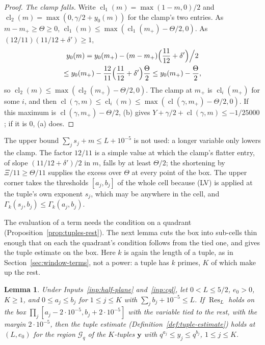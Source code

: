 \documentclass[11pt]{article}
\newtheorem{lemma}[theorem]{Lemma}
\theoremstyle{definition}
\begin{document}
\begin{proof}
\emph{The clamp falls.} Write $\operatorname{cl}_1(m) = \max(1 - m, 0)/2$ and $\operatorname{cl}_2(m) = \max(0, \gamma/2
+ y_0(m))$ for the clamp's two entries. As $m - m_+ \ge
\Theta \ge 0$, $\operatorname{cl}_1(m) \le \max(\operatorname{cl}_1(m_+) - \Theta/2, 0)$. As $(12/11)(11/12 + \delta')
\ge 1$,
\begin{multline*}
  y_0(m) = y_0(m_+) - (m - m_+)\Bigl(\frac{11}{12} + \delta'\Bigr)\Big/2 \\
  \le y_0(m_+) - \frac{12}{11}\Bigl(\frac{11}{12} + \delta'\Bigr)\frac\Theta2 \le y_0(m_+) - \frac\Theta2,
\end{multline*}
so $\operatorname{cl}_2(m) \le \max(\operatorname{cl}_2(m_+) - \Theta/2, 0)$. The clamp at $m_+$ is
$\operatorname{cl}_i(m_+)$ for some $i$, and then
$\operatorname{cl}(\gamma, m) \le \operatorname{cl}_i(m) \le \max(\operatorname{cl}(\gamma, m_+) - \Theta/2, 0)$. If this
maximum is $\operatorname{cl}(\gamma, m_+) - \Theta/2$, (b) gives $Y + \gamma/2 + \operatorname{cl}(\gamma, m) \le
-1/25000$; if it is $0$, (a) does.
\end{proof}

The upper bound $\sum_j s_j + m \le L + 10^{-5}$ is not used: a longer variable only lowers the clamp. The factor
$12/11$ is a simple value at which the clamp's flatter entry, of slope $(11/12 + \delta')/2$ in $m$, falls by at least
$\Theta/2$; the
shortening by $\Xi/11 \ge \Theta/11$ supplies the excess over $\Theta$ at every point of the box. The upper corner
takes the thresholds $[a_j, b_j]$ of the whole cell because (LV) is applied at the tuple's own exponent $s_j$, which
may be anywhere in the cell, and $\Gamma_k(s_j, b_j) \le \Gamma_k(a_j, b_j)$.

The evaluation of a term needs the condition on a quadrant (Proposition~\ref{prop:tuples-rest}). The next lemma cuts
the box into sub-cells thin enough that on each the quadrant's condition follows from the tied one, and gives the tuple
estimate on the box. Here $k$ is again the length of a tuple, as in Section~\ref{sec:window-terms}, not a power: a
tuple has $k$ primes, $K$ of which make up the rest.

\begin{lemma}\label{lem:tied-to-tuples}
Under Inputs~\ref{inp:half-plane} and~\ref{inp:cgl}, let $0 < L \le 5/2$, $e_0 > 0$, $K \ge 1$, and $0 \le a_j \le b_j$
for $1 \le j \le K$ with $\sum_j b_j + 10^{-5} \le L$. If $\operatorname{Res}_L$ holds on the box $\prod_j [a_j - 2
\cdot 10^{-5}, b_j + 2 \cdot 10^{-5}]$ with the variable tied to the rest, with the margin $2 \cdot 10^{-5}$, then the
tuple estimate (Definition~\ref{def:tuple-estimate}) holds at $(L, e_0)$ for the region $\mathcal G_q$ of the
$K$-tuples $\mathbf y$ with $q^{a_j} \le y_j \le q^{b_j}$, $1 \le j \le K$.
\end{lemma}
\end{document}
